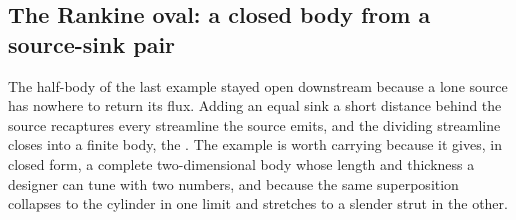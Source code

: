 \subsection{The Rankine oval: a closed body from a source-sink pair}

The half-body of the last example stayed open downstream because a
lone source has nowhere to return its flux. Adding an equal sink a
short distance behind the source recaptures every streamline the
source emits, and the dividing streamline closes into a finite body,
the . The example is worth carrying because it
gives, in closed form, a complete two-dimensional body whose length
and thickness a designer can tune with two numbers, and because the
same superposition collapses to the cylinder in one limit and stretches
to a slender strut in the other.



